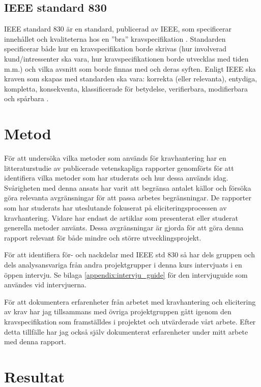 \subsection{IEEE standard 830}
IEEE standard 830 är en standard, publicerad av IEEE, som specificerar innehållet och kvaliteterna hos en ”bra” kravspecifikation \cite{ieee1998ieee}. Standarden specificerar både hur en kravspecifikation borde skrivas (hur involverad kund/intressenter ska vara, hur kravspecifikationen borde utvecklas med tiden m.m.) och vilka avsnitt som borde finnas med och deras syften. Enligt IEEE ska kraven som skapas med standarden ska vara: korrekta (eller relevanta), entydiga, kompletta, konsekventa, klassificerade för betydelse, verifierbara, modifierbara och spårbara \cite{ieee1998ieee}.

\section{Metod}
\label{sec:method-jannering}

För att undersöka vilka metoder som används för kravhantering har en litteraturstudie av publicerade vetenskapliga rapporter genomförts för att identifiera vilka metoder som har studerats och hur dessa används idag. Svårigheten med denna ansats har varit att begränsa antalet källor och försöka göra relevanta avgränsningar för att passa arbetes begränsningar. De rapporter som har studerats har uteslutande fokuserat på eliciteringsprocessen av kravhantering. Vidare har endast de artiklar som presenterat eller studerat generella metoder använts. Dessa avgränsningar är gjorda för att göra denna rapport relevant för både mindre och större utvecklingsprojekt.
  
För att identifiera för- och nackdelar med IEEE std 830 \cite{ieee1998ieee} så har dels gruppen och dels analysansvariga från andra projektgrupper i denna kurs intervjuats i en öppen intervju. Se bilaga \ref{appendix:intervju_guide} för den intervjuguide som användes vid intervjuerna.

För att dokumentera erfarenheter från arbetet med kravhantering och elicitering av krav har jag tillsammans med övriga projektgruppen gått igenom den kravspecifikation som framställdes i projektet och utvärderade vårt arbete. Efter detta tillfälle har jag också själv dokumenterat erfarenheter under mitt arbete med denna rapport.




\section{Resultat}
\label{sec:results-jannering}
